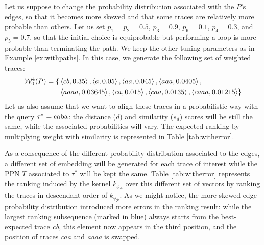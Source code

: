 \begin{example}\label{ex:moreskew}
	Let us suppose to change the probability distribution associated with the $P$'s edges, so that it becomes more skewed and that some traces are relatively more probable than others. Let us set $p_1=p_2=0.5$, $p_3=0.9$, $p_6=0.1$, $p_4=0.3$, and $p_5=0.7$, so that the initial choice is equiprobable but performing a loop is more probable than terminating the path. We keep the other tuning parameters as in Example \ref{ex:withpaths}. In this case, we generate the following set of weighted traces:
$$\begin{aligned}
	\mathcal{W}_0^4(P)=\{&\braket{cb,0.35},\braket{a,0.05},\braket{aa,0.045},\braket{aaa,0.0405},\\
	&\braket{aaaa,0.03645},\braket{ca,0.015},\braket{caa,0.0135},\braket{caaa,0.01215}\}\\
\end{aligned}$$
	Let us also assume that we want to align these traces in a probabilistic way with the query $\tau^*=\textup{caba}$: the distance ($d$) and similarity ($s_d$) scores will be still the same, while the associated probabilities will vary. The expected ranking by multiplying weight with similarity is represented in Table \ref{tab:witherror}. 

As a consequence of the different probability distribution associated to the edges, a different set of embedding will be generated for each trace of interest while the PPN $T$ associated to $\tau^*$ will be kept the same. Table \ref{tab:witherror} represents the ranking induced by the kernel $k_{\phi_{\mathcal{P}}}$ over this different set of vectors by ranking the traces in descendant order of $k_{\phi_{\mathcal{P}}}$. As we might notice, the more skewed edge probability distribution introduced more errors in the ranking result: while the largest ranking subsequence (marked in blue) always starts from the best-expected trace \textit{cb}, this element now appears in the third position, and the position of traces \textit{caa} and \textit{aaaa} is swapped.  
 
\end{example}
